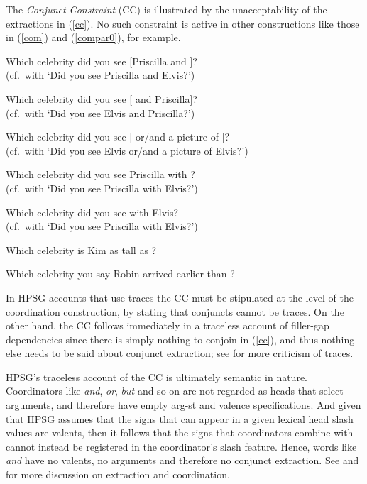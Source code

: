 \documentclass[output=paper]{langsci/langscibook}
\begin{document}
\noindent
The \emph{Conjunct Constraint} (CC) is illustrated by the unacceptability of the extractions in (\ref{cc}). No such constraint is active in other constructions like those in (\ref{com}) and (\ref{compar0}), for example. 
 

\ea\label{cc} 
\ea \bad{*}Which celebrity did you see [Priscilla and \spc]?\\
(cf.\ with `Did you see Priscilla and Elvis?')
\item  \bad{*}Which celebrity did you see  [ \spc and Priscilla]?\\
(cf.\ with `Did you see Elvis and Priscilla?')
\item \bad{*}Which celebrity did you see  [ \spc or/and a picture of \spc]?\\
(cf.\ with `Did you see Elvis or/and a picture of Elvis?')
\z 
\z

\ea  \ea Which celebrity did you see Priscilla with \spc?\\
(cf.\ with `Did you see Priscilla with Elvis?')
\item Which celebrity did you see \spc with Elvis?\\
(cf.\ with `Did you see Priscilla with Elvis?')
\z \label{com}
\z


\ea  
\ea Which celebrity  is Kim as tall as \spc?
\item Which celebrity you say Robin arrived earlier than \spc?
\z \label{compar0}
\z

\noindent
In HPSG accounts that use traces \citep{pollardsag,levhubook} the CC must be stipulated at the level of the coordination construction, by stating that conjuncts cannot be traces. On the other hand, the CC  follows immediately in a traceless account of  filler-gap dependencies  \citep{fodorsagt,bouma,ginzsag,fgsag08} since there is simply nothing to conjoin in (\ref{cc}), and thus nothing else needs to be said about conjunct extraction; see \citet{sagonline} for more criticism of  traces. 

HPSG's traceless account of the CC is ultimately semantic in nature.  Coordinators like \emph{and}, \emph{or}, \emph{but} and so on are not regarded as heads that select arguments, and therefore
have empty {\sc arg-st} and valence specifications. And given that HPSG assumes that
the signs that can appear  in a given lexical head {\sc slash} values are valents, then
it follows that the signs that coordinators combine with cannot instead be registered
in the coordinator's {\sc slash} feature. Hence, words like \emph{and} have no valents, no arguments
and therefore no conjunct extraction. See  and  for more discussion on extraction and coordination.
 
\end{document}
